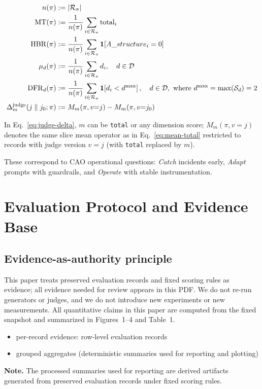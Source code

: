 \documentclass{article}
\begin{document}
\begin{align}
n(\pi) &:= \left|\mathcal{R}_{\pi}\right| \label{eq:coverage}\\
\mathrm{MT}(\pi) &:= \frac{1}{n(\pi)}\sum_{i\in \mathcal{R}_{\pi}} \mathrm{total}_i \label{eq:mean-total}\\
\mathrm{HBR}(\pi) &:= \frac{1}{n(\pi)}\sum_{i\in \mathcal{R}_{\pi}} \mathbf{1}\!\left[A\_structure_i = 0\right] \label{eq:hbr}\\
\mu_{d}(\pi) &:= \frac{1}{n(\pi)}\sum_{i\in \mathcal{R}_{\pi}} d_i,\quad d\in\mathcal{D} \label{eq:dim-mean}\\
\mathrm{DFR}_{d}(\pi) &:= \frac{1}{n(\pi)}\sum_{i\in \mathcal{R}_{\pi}} \mathbf{1}\!\left[d_i < d^{\max}\right],
\quad d\in\mathcal{D},\ \text{where } d^{\max}=\max(\mathcal{S}_d)=2 \label{eq:dim-fail}\\
\Delta^{\text{judge}}_{m}(j\parallel j_0;\pi) &:= M_{m}(\pi, v{=}j) - M_{m}(\pi, v{=}j_0) \label{eq:judge-delta}
\end{align}

\noindent
In Eq.~\ref{eq:judge-delta}, $m$ can be \texttt{total} or any dimension score; $M_m(\pi, v{=}j)$ denotes the same slice mean operator as in Eq.~\ref{eq:mean-total} restricted to records with judge version $v=j$ (with \texttt{total} replaced by $m$).

These correspond to CAO operational questions: \emph{Catch} incidents early, \emph{Adapt} prompts with guardrails, and \emph{Operate} with stable instrumentation.

\section{Evaluation Protocol and Evidence Base}
\subsection{Evidence-as-authority principle}
This paper treats preserved evaluation records and fixed scoring rules as evidence; all evidence needed for review appears in this PDF.
We do not re-run generators or judges, and we do not introduce new experiments or new measurements.
All quantitative claims in this paper are computed from the fixed snapshot and summarized in Figures~1--4 and Table~1.
\begin{itemize}[leftmargin=1.2em, itemsep=1pt, topsep=2pt]
  \item per-record evidence: row-level evaluation records
  \item grouped aggregates (deterministic summaries used for reporting and plotting)
\end{itemize}
\noindent\textbf{Note.} The processed summaries used for reporting are derived artifacts generated from preserved evaluation records under fixed scoring rules.
\end{document}
